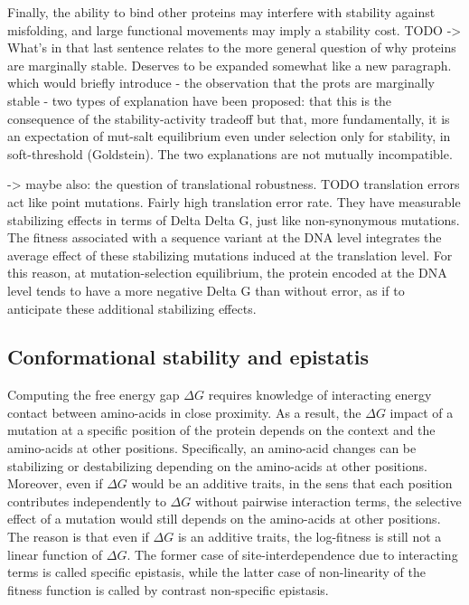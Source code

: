 Finally, the ability to bind other proteins may interfere with stability against misfolding, and large functional movements may imply a stability cost.
TODO
-> What's in that last sentence relates to the more general question of why proteins are marginally stable.
Deserves to be expanded somewhat like a new paragraph.
which would briefly introduce
- the observation that the prots are marginally stable
- two types of explanation have been proposed:
that this is the consequence of the stability-activity tradeoff
but that, more fundamentally, it is an expectation of mut-salt equilibrium even under selection only for stability,
in soft-threshold (Goldstein). The two explanations are not mutually incompatible.

-> maybe also: the question of translational robustness.
TODO
translation errors act like point mutations.
Fairly high translation error rate.
They have measurable stabilizing effects in terms of Delta Delta G, just like non-synonymous mutations.
The fitness associated with a sequence variant at the DNA level integrates the average effect of these stabilizing mutations induced at the translation level.
For this reason, at mutation-selection equilibrium, the protein encoded at the DNA level tends to have a more negative Delta G than without error, as if to anticipate these additional stabilizing effects.

\subsection{Conformational stability and epistatis}

Computing the free energy gap $\Delta G$ requires knowledge of interacting energy contact between amino-acids in close proximity.
As a result, the $\Delta G$ impact of a mutation at a specific position of the protein depends on the context and the amino-acids at other positions.
Specifically, an amino-acid changes can be stabilizing or destabilizing depending on the amino-acids at other positions.
Moreover, even if $\Delta G$ would be an additive traits, in the sens that each position contributes independently to $\Delta G$ without pairwise interaction terms, the selective effect of a mutation would still depends on the amino-acids at other positions.
The reason is that even if $\Delta G$ is an additive traits, the log-fitness is still not a linear function of $\Delta G$.
The former case of site-interdependence due to interacting terms is called specific epistasis, while the latter case of non-linearity of the fitness function is called by contrast non-specific epistasis.

